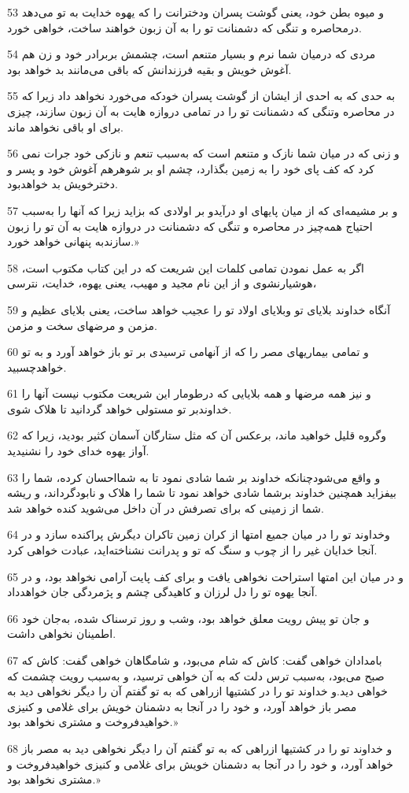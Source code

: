 \par 53 و میوه بطن خود، یعنی گوشت پسران ودخترانت را که یهوه خدایت به تو می‌دهد درمحاصره و تنگی که دشمنانت تو را به آن زبون خواهند ساخت، خواهی خورد.
\par 54 مردی که درمیان شما نرم و بسیار متنعم است، چشمش بربرادر خود و زن هم آغوش خویش و بقیه فرزندانش که باقی می‌مانند بد خواهد بود.
\par 55 به حدی که به احدی از ایشان از گوشت پسران خودکه می‌خورد نخواهد داد زیرا که در محاصره وتنگی که دشمنانت تو را در تمامی دروازه هایت به آن زبون سازند، چیزی برای او باقی نخواهد ماند.
\par 56 و زنی که در میان شما نازک و متنعم است که به‌سبب تنعم و نازکی خود جرات نمی کرد که کف پای خود را به زمین بگذارد، چشم او بر شوهرهم آغوش خود و پسر و دخترخویش بد خواهدبود.
\par 57 و بر مشیمه‌ای که از میان پایهای او درآیدو بر اولادی که بزاید زیرا که آنها را به‌سبب احتیاج همه‌چیز در محاصره و تنگی که دشمنانت در دروازه هایت به آن تو را زبون سازندبه پنهانی خواهد خورد.»
\par 58 اگر به عمل نمودن تمامی کلمات این شریعت که در این کتاب مکتوب است، هوشیارنشوی و از این نام مجید و مهیب، یعنی یهوه، خدایت، نترسی،
\par 59 آنگاه خداوند بلایای تو وبلایای اولاد تو را عجیب خواهد ساخت، یعنی بلایای عظیم و مزمن و مرضهای سخت و مزمن.
\par 60 و تمامی بیماریهای مصر را که از آنهامی ترسیدی بر تو باز خواهد آورد و به تو خواهدچسبید.
\par 61 و نیز همه مرضها و همه بلایایی که درطومار این شریعت مکتوب نیست آنها را خداوندبر تو مستولی خواهد گردانید تا هلاک شوی.
\par 62 وگروه قلیل خواهید ماند، برعکس آن که مثل ستارگان آسمان کثیر بودید، زیرا که آواز یهوه خدای خود را نشنیدید.
\par 63 و واقع می‌شودچنانکه خداوند بر شما شادی نمود تا به شمااحسان کرده، شما را بیفزاید همچنین خداوند برشما شادی خواهد نمود تا شما را هلاک و نابودگرداند، و ریشه شما از زمینی که برای تصرفش در آن داخل می‌شوید کنده خواهد شد.
\par 64 وخداوند تو را در میان جمیع امتها از کران زمین تاکران دیگرش پراکنده سازد و در آنجا خدایان غیر را از چوب و سنگ که تو و پدرانت نشناخته‌اید، عبادت خواهی کرد.
\par 65 و در میان این امتها استراحت نخواهی یافت و برای کف پایت آرامی نخواهد بود، و در آنجا یهوه تو را دل لرزان و کاهیدگی چشم و پژمردگی جان خواهدداد.
\par 66 و جان تو پیش رویت معلق خواهد بود، وشب و روز ترسناک شده، به‌جان خود اطمینان نخواهی داشت.
\par 67 بامدادان خواهی گفت: کاش که شام می‌بود، و شامگاهان خواهی گفت: کاش که صبح می‌بود، به‌سبب ترس دلت که به آن خواهی ترسید، و به‌سبب رویت چشمت که خواهی دید.و خداوند تو را در کشتیها ازراهی که به تو گفتم آن را دیگر نخواهی دید به مصر باز خواهد آورد، و خود را در آنجا به دشمنان خویش برای غلامی و کنیزی خواهیدفروخت و مشتری نخواهد بود.» 
\par 68 و خداوند تو را در کشتیها ازراهی که به تو گفتم آن را دیگر نخواهی دید به مصر باز خواهد آورد، و خود را در آنجا به دشمنان خویش برای غلامی و کنیزی خواهیدفروخت و مشتری نخواهد بود.»
 
